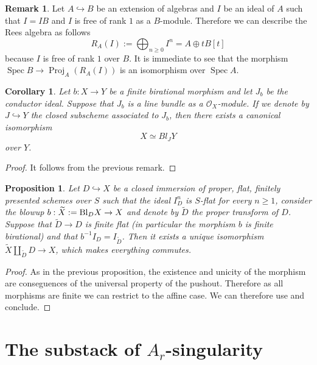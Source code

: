 \documentclass{alggeom}
\numberwithin{equation}{section}
\numberwithin{subsection}{section}
\newtheorem{proposition}[theorem]{Proposition}
\newtheorem{corollary}[theorem]{Corollary}
\theoremstyle{definition}
\newtheorem{remark}[theorem]{Remark}
\theoremstyle{remark}
\newcommand\cO{\mathcal{O}} \newcommand\cP{\mathcal{P}}
\newcommand\into{\hookrightarrow}
\newcommand\spec{\operatorname{Spec}}
\newcommand{\proj}{\operatorname{Proj}}
\begin{document}
\begin{remark}
    Let $A\into B$ be an extension of algebras and $I$ be an ideal of $A$ such that $I=IB$ and $I$ is free of rank $1$ as a $B$-module. Therefore we can describe the Rees algebra as follows
	$$R_A(I):=\bigoplus_{n\geq 0}I^n=A\oplus tB[t]$$
	because $I$ is free of rank $1$ over $B$. It is immediate to see that the morphism $\spec B \rightarrow \proj_A(R_A(I))$ is an isomorphism over $\spec A$.
\end{remark}

\begin{corollary}
  Let $b:X\rightarrow Y$ be a finite birational morphism and let $J_b$ be the conductor ideal. Suppose that $J_b$ is a line bundle as a $\cO_X$-module. If we denote by $J\into Y$ the closed subscheme associated to $J_b$, then there exists a canonical isomorphism 
   $$ X \simeq Bl_J Y$$
   over $Y$.
\end{corollary}

\begin{proof}
 It follows from the previous remark.
\end{proof}

\begin{proposition}\label{prop:blowup-pushout}
	Let $D\into X$ be a closed immersion of proper, flat, finitely presented schemes over $S$ such that the ideal $I_D^n$ is $S$-flat for every $n\geq 1$, consider the blowup $b:\widetilde{X}:={\rm Bl}_DX\rightarrow X$ and denote by $\widetilde{D}$ the proper transform of $D$. Suppose that $\widetilde{D}\rightarrow D$ is finite flat (in particular the morphism $b$ is finite birational) and that $b^{-1}I_D = I_{\widetilde{D}}$. Then it exists a unique isomorphism  $\widetilde{X}\amalg_{\widetilde{D}} D\rightarrow X$, which makes everything commutes.  
\end{proposition}

\begin{proof}
	As in the previous proposition, the existence and unicity of the morphism are conseguences of the universal property of the pushout. Therefore as all morphisms are finite we can restrict to the affine case. We can therefore use  and conclude.
\end{proof}





\section{The substack of $A_r$-singularity}\label{sec:4}
\end{document}
